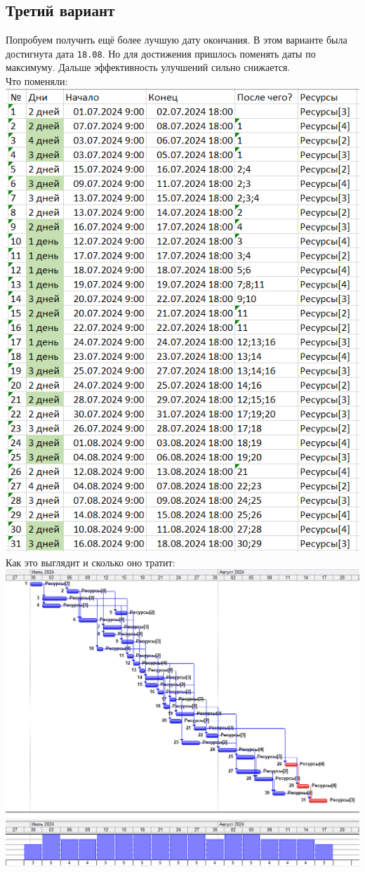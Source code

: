 \documentclass[14pt]{article}
\begin{document}
	\subsection{Третий вариант}
		Попробуем получить ещё более лучшую дату окончания.
		В этом варианте была достигнута дата \texttt{18.08}.
		Но для достижения пришлось поменять даты по максимуму.
		Дальше эффективность улучшений сильно снижается.\\
		{\LARGE Что поменяли:}\\
		\includegraphics[height=0.6\textheight]{../img/2a3_days_change.png}\\ 
		{\LARGE Как это выглядит и сколько оно тратит:}\\
		\includegraphics[width=\textwidth]{../img/2a3_answer.png}\\ 
\end{document}
